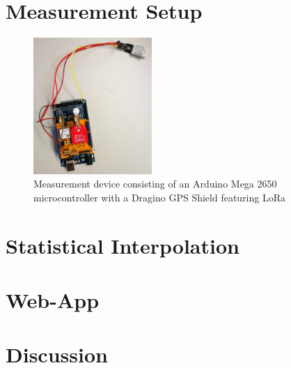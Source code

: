 \section{Measurement Setup}\label{sec:setup}

\begin{figure}[h!]\label{fig:device}
\centering
\includegraphics[width=0.4\textwidth]{figures/device}
\caption{Measurement device consisting of an Arduino Mega 2650 microcontroller with a Dragino GPS Shield featuring LoRa}
\end{figure}

\section{Statistical Interpolation}\label{sec:kriging}

\section{Web-App}\label{sec:app}

\section{Discussion}\label{sec:disc}





